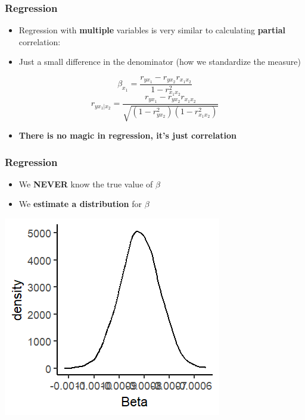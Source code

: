 \documentclass[xcolor=x11names,compress]{beamer}\usepackage[]{graphicx}\usepackage[]{color}
\makeatletter
\def\maxwidth{ %
  \ifdim\Gin@nat@width>\linewidth
    \linewidth
  \else
    \Gin@nat@width
  \fi
}
\newenvironment{knitrout}{}{} %
\renewcommand{\(}{\begin{columns}}
\renewcommand{\)}{\end{columns}}
\newcommand{\<}[1]{\begin{column}{#1}}
\renewcommand{\>}{\end{column}}
\makeatother
\begin{document}
\begin{frame}
\frametitle{Regression}
\begin{itemize}
\item Regression with \textbf{multiple} variables is very similar to calculating \textbf{partial} correlation:
\pause
\item Just a small difference in the denominator (how we standardize the measure)
\pause
\end{itemize}
$$\beta_{x_1} = \frac{r_{yx_1} - r_{yx_2}r_{x_1x_2}}{1-r^2_{x_1x_2}}$$
$$r_{yx_1|x_2} = \frac{r_{yx_1} - r_{yx_2}r_{x_1x_2}}{\sqrt{(1-r^2_{yx_2})(1-r^2_{x_1x_2})}}$$
\begin{itemize}
\item \textbf{There is no magic in regression, it's just correlation}
\end{itemize}
\end{frame}

\begin{frame}
\frametitle{Regression}
\begin{itemize}
\item We \textbf{NEVER} know the true value of $\beta$
\pause
\item We \textbf{estimate a distribution} for $\beta$
\end{itemize}
\begin{knitrout}
\color{fgcolor}
\includegraphics[width=\maxwidth]{figure/beta_dist-1} 

\end{knitrout}
\end{frame}
\end{document}
